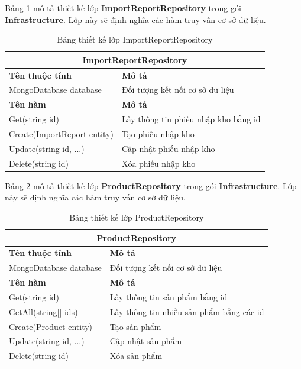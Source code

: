 \documentclass[../DoAn.tex]{subfiles}
\begin{document}
Bảng \ref{table:class-importreportrepository} mô tả thiết kế lớp \textbf{ImportReportRepository} trong gói \textbf{Infrastructure}. Lớp này sẽ định nghĩa các hàm truy vấn cơ sở dữ liệu.
\begin{table}[H]
    \begin{tabularx}{\textwidth}{|l|X|}
        \hline
        \multicolumn{2}{|c|}{\textbf{ImportReportRepository}}              \\ \hline
        \textbf{Tên thuộc tính}     & \textbf{Mô tả}                       \\ \hline
        MongoDatabase database      & Đối tượng kết nối cơ sở dữ liệu      \\ \hline
        \textbf{Tên hàm}            & \textbf{Mô tả}                       \\ \hline
        Get(string id)              & Lấy thông tin phiếu nhập kho bằng id \\ \hline
        Create(ImportReport entity) & Tạo phiếu nhập kho                   \\ \hline
        Update(string id, ...)      & Cập nhật phiếu nhập kho              \\ \hline
        Delete(string id)           & Xóa phiếu nhập kho                   \\ \hline
    \end{tabularx}
    \caption{Bảng thiết kế lớp ImportReportRepository}
    \label{table:class-importreportrepository}
\end{table}

Bảng \ref{table:class-productrepository} mô tả thiết kế lớp \textbf{ProductRepository} trong gói \textbf{Infrastructure}. Lớp này sẽ định nghĩa các hàm truy vấn cơ sở dữ liệu.
\begin{table}[H]
    \begin{tabularx}{\textwidth}{|l|X|}
        \hline
        \multicolumn{2}{|c|}{\textbf{ProductRepository}}                   \\ \hline
        \textbf{Tên thuộc tính} & \textbf{Mô tả}                           \\ \hline
        MongoDatabase database  & Đối tượng kết nối cơ sở dữ liệu          \\ \hline
        \textbf{Tên hàm}        & \textbf{Mô tả}                           \\ \hline
        Get(string id)          & Lấy thông tin sản phẩm bằng id           \\ \hline
        GetAll(string[] ids)    & Lấy thông tin nhiều sản phẩm bằng các id \\ \hline
        Create(Product entity)  & Tạo sản phẩm                             \\ \hline
        Update(string id, ...)  & Cập nhật sản phẩm                        \\ \hline
        Delete(string id)       & Xóa sản phẩm                             \\ \hline
    \end{tabularx}
    \caption{Bảng thiết kế lớp ProductRepository}
    \label{table:class-productrepository}
\end{table}
\break
\end{document}
